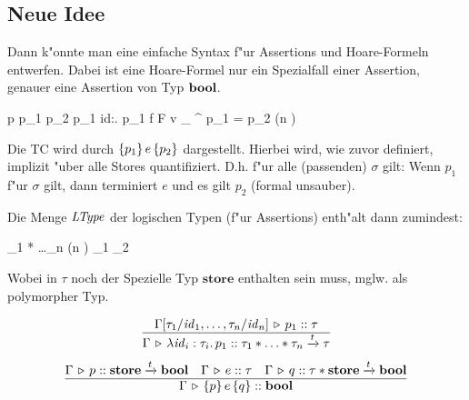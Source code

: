 \documentclass[12pt,a4paper,bigheadings]{scrartcl}
\begin{document}
\subsection*{Neue Idee}

Dann k"onnte man eine einfache Syntax f"ur Assertions und Hoare-Formeln entwerfen. Dabei ist
eine Hoare-Formel nur ein Spezialfall einer Assertion, genauer eine Assertion von Typ $\textbf{bool}$.

\bgram
p \is p_1 \wedge p_2
  \al \neg p_1
  \al \forall id:\hat{\pi}. p_1 \quad\quad {}
  \al {}
  \al f \in F
  \al \id \in \Id
  \al v \in \bigcup_{\tau\in\Type} \Val^\tau
  \al p_1 = p_2
  \al {} \quad (n )
  \al {}
  \n
\egram

\noindent
Die TC wird durch $\{p_1\}\,e\,\{p_2\}$ dargestellt. Hierbei wird, wie zuvor definiert, implizit
"uber alle Stores quantifiziert. D.h. f"ur alle (passenden) $\sigma$ gilt: Wenn $p_1$ f"ur $\sigma$
gilt, dann terminiert $e$ und es gilt $p_2$ (formal unsauber).

Die Menge ${\text{\it LType\/}}$ der logischen Typen (f"ur Assertions) enth"alt dann zumindest:

\bgram
\pi \is \tau
    \al \pi_1 * \ldots * \pi_n \quad (n )
    \al \pi_1  \pi_2
    \n
\egram

\noindent
Wobei in $\tau$ noch der Spezielle Typ $\textbf{store}$ enthalten sein muss, mglw.
als polymorpher Typ.

\[
  \regel{\Tj{\Gamma[\tau_1/\id_1,\ldots,\tau_n/\id_n]}{p_1}{\tau}}
        {\Tj{\Gamma}{\abstr{\id_i:\tau_i}{p_1}}{\tau_1*\ldots*\tau_n\xrightarrow{t}\tau}}
\]
\[
  \regel{\Tj{\Gamma}{p}{\textbf{store}\xrightarrow{t}\bool} \quad
         \Tj{\Gamma}{e}{\tau} \quad
         \Tj{\Gamma}{q}{\tau*\textbf{store}\xrightarrow{t}\bool}}
        {\Tj{\Gamma}{\triple{p}{e}{q}}{\bool}}
\]
\end{document}
